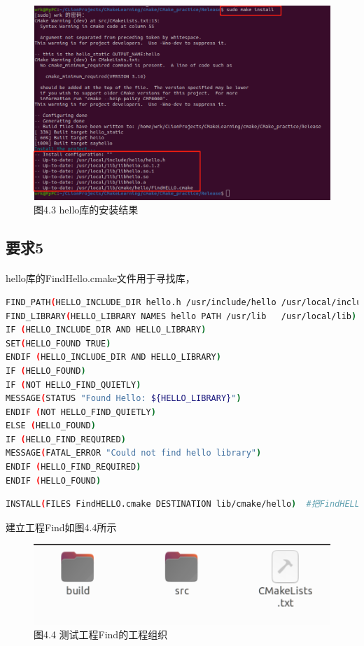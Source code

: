 \documentclass[40pt,a4paper，UTF8]{ctexart}
\begin{document}
\begin{figure}[H]
\centering
\includegraphics[width=4.8in]{ch1_4_3.png} {图4.3 hello库的安装结果}
\end{figure}

\subsection{要求5} 
\paragraph{}

hello库的FindHello.cmake文件用于寻找库，
\begin{lstlisting}[language=bash, caption=hello工程/cmake/FindHELLO.cmake]
FIND_PATH(HELLO_INCLUDE_DIR hello.h /usr/include/hello /usr/local/include/hello)
FIND_LIBRARY(HELLO_LIBRARY NAMES hello PATH /usr/lib   /usr/local/lib)
IF (HELLO_INCLUDE_DIR AND HELLO_LIBRARY)
SET(HELLO_FOUND TRUE)
ENDIF (HELLO_INCLUDE_DIR AND HELLO_LIBRARY)
IF (HELLO_FOUND)
IF (NOT HELLO_FIND_QUIETLY)
MESSAGE(STATUS "Found Hello: ${HELLO_LIBRARY}")
ENDIF (NOT HELLO_FIND_QUIETLY)
ELSE (HELLO_FOUND)
IF (HELLO_FIND_REQUIRED)
MESSAGE(FATAL_ERROR "Could not find hello library")
ENDIF (HELLO_FIND_REQUIRED)
ENDIF (HELLO_FOUND)
\end{lstlisting}

\begin{lstlisting}[language=bash, caption=hello工程/cmake/CMakeLists.txt]
INSTALL(FILES FindHELLO.cmake DESTINATION lib/cmake/hello)  #把FindHELLO.cmake安装到对应位置
\end{lstlisting}

建立工程Find如图4.4所示
\begin{figure}[H]
\centering
\includegraphics[width=4.8in]{ch1_4_4.png} {图4.4 测试工程Find的工程组织}
\end{figure}
\end{document}
